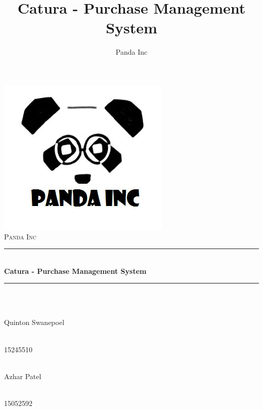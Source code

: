 \documentclass[11pt]{article}
\author{Panda Inc}
\title{Catura - Purchase Management System}
\begin{document}
\begin{titlepage}
	
	\begin{center}
        \includegraphics[width=0.7\linewidth]{Images/PandaInc_logo.jpg}\\[1cm] 
		\textsc{\LARGE Panda Inc}\\[0.3cm]
		\rule{\linewidth}{0.5mm} \\[1cm]
		{ \huge \bfseries Catura - Purchase Management System}\\[0.5cm]
		\rule{\linewidth}{0.5mm} \\[1cm] 		
  
		
		\begin{minipage}{0.4\textwidth}
			\begin{flushleft} \large
				\emph{} \\
				Quinton {Swanepoel}
			\end{flushleft}
		\end{minipage}
		\begin{minipage}{0.4\textwidth}
			\begin{flushright} \large
				\emph{} \\
				15245510
			\end{flushright}
		\end{minipage}

		\begin{minipage}{0.4\textwidth}
			\begin{flushleft} \large
            	\emph{} \\
				Azhar {Patel}
			\end{flushleft}
		\end{minipage}
		\begin{minipage}{0.4\textwidth}
			\begin{flushright} \large
				\emph{} \\
				15052592
			\end{flushright}
		\end{minipage}
		

\end{center}
\end{titlepage}
\end{document}
